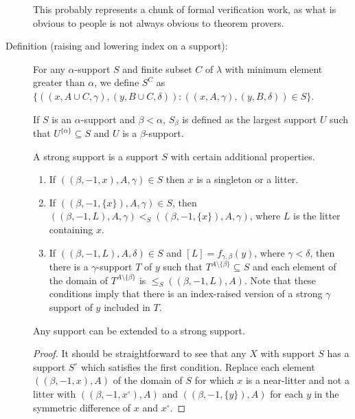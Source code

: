 \begin{description}
This probably represents a chunk of formal verification work, as what is obvious to people is not always obvious to theorem provers.

\item[Definition (raising and lowering index on a support):]  For any $\alpha$-support $S$ and finite subset $C$ of $\lambda$ with minimum element greater than $\alpha$, we define $S^C$ as
$\{((x,A\cup C,\gamma),(y,B\cup C,\delta)):((x,A,\gamma),(y,B,\delta)) \in S\}$.

If $S$ is an $\alpha$-support and $\beta<\alpha$, $S_\beta$ is defined as the largest support $U$ such that $U^{\{\alpha\}} \subseteq S$ and $U$ is a $\beta$-support.

\begin{definition}
\label {def:strong-support}
A strong support is a support $S$ with certain additional properties.

\begin{enumerate}
\item  If $((\beta,-1,x),A,\gamma) \in S$ then $x$ is a singleton or a litter.

\item  If $((\beta,-1,\{x\}),A,\gamma) \in S$, then $((\beta,-1,L),A,\gamma) <_S ((\beta,-1,\{x\}),A,\gamma)$, where $L$ is the litter containing $x$.

\item  If $((\beta,-1,L),A,\delta) \in S$ and $[L]=f_{\gamma,\beta}(y)$, where $\gamma<\delta$, then there is a $\gamma$-support $T$ of $y$ such that $T^{A \setminus \{\beta\}} \subseteq S$ and each element of the domain of $T^{A \setminus \{\beta\}}$ is $\leq_S ((\beta,-1,L),A)$.  Note that these conditions imply that there is an index-raised version of a strong $\gamma$ support of $y$ included in $T$.

\end{enumerate}
\end{definition}

\begin{lemma}
\label {strengthen-support}
Any support can be extended to a strong support.
\end{lemma}

\begin{proof}
It should be straightforward to see that any $X$ with support $S$ has a support $S^\circ$ which satisfies the first condition.  Replace each element $((\beta,-1,x),A)$ of the domain of $S$ for which $x$ is a near-litter and not a litter with $((\beta,-1,x^\circ),A)$ and $((\beta,-1,\{y\}),A)$ for each $y$ in the symmetric difference of $x$ and $x^\circ$.


\end{proof}
\end{description}
